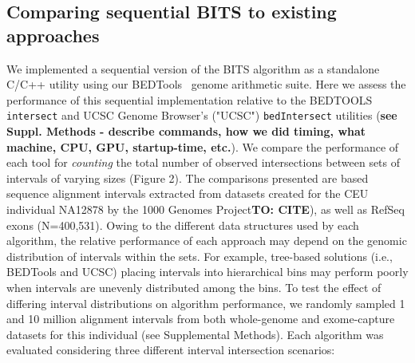 \documentclass{bioinfo}
\begin{document}
        \subsection{Comparing sequential BITS to existing approaches}
        We implemented a sequential version of the BITS algorithm as a
        standalone C/C++ utility using our BEDTools~\citep{quinlan2010} 
        genome arithmetic suite. Here we assess the performance of this 
        sequential implementation relative to the BEDTOOLS \texttt{intersect}
        and UCSC Genome Browser's ("UCSC") \citep{kent2002} \texttt{bedIntersect} 
        utilities (\textbf{see Suppl. Methods - describe commands, how we did 
        timing, what machine, CPU, GPU, startup-time, etc.}).
        We compare the performance of each tool for \emph{counting} the total
        number of observed intersections between sets of intervals of varying
        sizes (Figure 2). The comparisons presented are based sequence alignment
        intervals extracted from datasets created for the CEU individual NA12878 
        by the 1000 Genomes Project\textbf{TO: CITE}), as well as
        RefSeq exons (N=400,531). Owing to the different data structures used by
        each algorithm, the relative performance of each approach may depend 
        on the genomic distribution of intervals within the sets.  For example, 
        tree-based solutions (i.e., BEDTools and UCSC) placing intervals into 
        hierarchical bins may perform poorly when intervals are unevenly 
        distributed among the bins. To test the effect of differing interval 
        distributions on algorithm performance, we randomly sampled 1 and 10 
        million alignment intervals from both whole-genome and exome-capture 
        datasets for this individual (see Supplemental Methods). Each algorithm 
        was evaluated considering three different interval 
        intersection scenarios:
\end{document}

